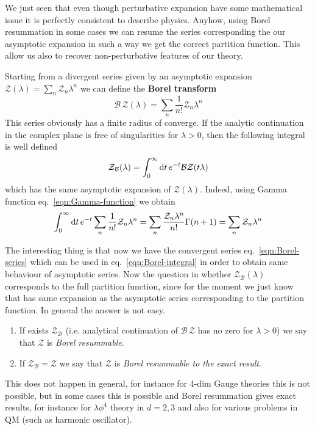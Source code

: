 \documentclass[../main/main.tex]{subfiles}
\begin{document}
We just seen that even though perturbative expansion have some mathematical issue it is perfectly consistent to describe physics. Anyhow, using Borel resummation in some cases we can resume the series corresponding the our asymptotic expansion in such a way we get the correct partition function. This allow us also to recover non-perturbative features of our theory. 

Starting from a divergent series given by an asymptotic expansion $\mathcal Z(\lambda)=\sum_n\mathcal Z_n\lambda^n$ we can define the \textbf{Borel transform} 
\begin{equation}\label{eqn:Borel-series}
\mathcal B\,\mathcal Z(\lambda)=\sum_n\frac1{n!}\mathcal Z_n\lambda^n
\end{equation}
This series obviously has a finite radius of converge. If the analytic continuation in the complex plane is free of singularities for $\lambda>0$, then the following integral is well defined
\begin{equation}\label{eqn:Borel-integral}
\mathcal Z_{\mathcal B}(\lambda)=\int_0^\infty\textup{d} t\, e^{-t}\mathcal B\mathcal Z(t\lambda)
\end{equation}
which has the same asymptotic expansion of $\mathcal Z(\lambda)$. Indeed, using Gamma function eq.~\eqref{eqn:Gamma-function} we obtain
\[\int_0^\infty\textup{d} t\, e^{-t}\sum_n\frac1{n!}\mathcal Z_n\lambda^n
=\sum_n\frac{\mathcal Z_n\lambda^n}{n!}\Gamma(n+1)=\sum_n\mathcal Z_n\lambda^n\]

The interesting thing is that now we have the convergent series eq.~\eqref{eqn:Borel-series} which can be used in eq.~\eqref{eqn:Borel-integral} in order to obtain same behaviour of asymptotic series.
Now the question in whether $\mathcal Z_{\mathcal B}(\lambda)$ corresponds to the full partition function, since for the moment we just know that has same expansion as the asymptotic series corresponding to the partition function. In general the answer is not easy. 
\begin{enumerate}[label=\textbullet]
\item If exists $\mathcal Z_{\mathcal B}$ (i.e. analytical continuation of $\mathcal B\,\mathcal Z$ has no zero for $\lambda>0$) we say that $\mathcal Z$ is \emph{Borel resummable}.
\item If $\mathcal Z_{\mathcal B}=\mathcal Z$ we say that $\mathcal Z$ is \emph{Borel resummable to the exact result}.
\end{enumerate}
This does not happen in general, for instance for 4-dim Gauge theories this is not possible, but in some cases this is possible and Borel resummation gives exact results, for instance for $\lambda\phi^4$ theory in $d=2,3$ and also for various problems in QM (such as harmonic oscillator). 
\end{document}
